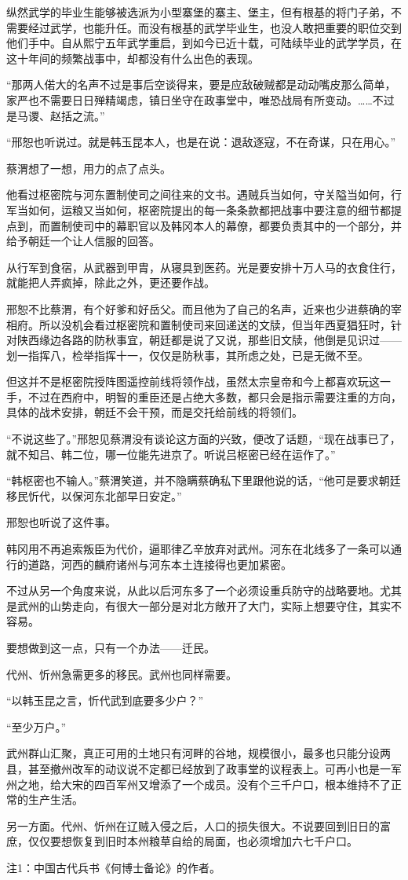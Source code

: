 纵然武学的毕业生能够被选派为小型寨堡的寨主、堡主，但有根基的将门子弟，不需要经过武学，也能升任。而没有根基的武学毕业生，也没人敢把重要的职位交到他们手中。自从熙宁五年武学重启，到如今已近十载，可陆续毕业的武学学员，在这十年间的频繁战事中，却都没有什么出色的表现。

“那两人偌大的名声不过是事后空谈得来，要是应敌破贼都是动动嘴皮那么简单，家严也不需要日日殚精竭虑，镇日坐守在政事堂中，唯恐战局有所变动。……不过是马谡、赵括之流。”

“邢恕也听说过。就是韩玉昆本人，也是在说：退敌逐寇，不在奇谋，只在用心。”

蔡渭想了一想，用力的点了点头。

他看过枢密院与河东置制使司之间往来的文书。遇贼兵当如何，守关隘当如何，行军当如何，运粮又当如何，枢密院提出的每一条条款都把战事中要注意的细节都提点到，而置制使司中的幕职官以及韩冈本人的幕僚，都要负责其中的一个部分，并给予朝廷一个让人信服的回答。

从行军到食宿，从武器到甲胄，从寝具到医药。光是要安排十万人马的衣食住行，就能把人弄疯掉，除此之外，更还要作战。

邢恕不比蔡渭，有个好爹和好岳父。而且他为了自己的名声，近来也少进蔡确的宰相府。所以没机会看过枢密院和置制使司来回递送的文牍，但当年西夏猖狂时，针对陕西缘边各路的防秋事宜，朝廷都是说了又说，那些旧文牍，他倒是见识过——划一指挥八，检举指挥十一，仅仅是防秋事，其所虑之处，已是无微不至。

但这并不是枢密院授阵图遥控前线将领作战，虽然太宗皇帝和今上都喜欢玩这一手，不过在西府中，明智的重臣还是占绝大多数，都只会是指示需要注重的方向，具体的战术安排，朝廷不会干预，而是交托给前线的将领们。

“不说这些了。”邢恕见蔡渭没有谈论这方面的兴致，便改了话题，“现在战事已了，就不知吕、韩二位，哪一位能先进京了。听说吕枢密已经在运作了。”

“韩枢密也不输人。”蔡渭笑道，并不隐瞒蔡确私下里跟他说的话，“他可是要求朝廷移民忻代，以保河东北部早日安定。”

邢恕也听说了这件事。

韩冈用不再追索叛臣为代价，逼耶律乙辛放弃对武州。河东在北线多了一条可以通行的道路，河西的麟府诸州与河东本土连接得也更加紧密。

不过从另一个角度来说，从此以后河东多了一个必须设重兵防守的战略要地。尤其是武州的山势走向，有很大一部分是对北方敞开了大门，实际上想要守住，其实不容易。

要想做到这一点，只有一个办法——迁民。

代州、忻州急需更多的移民。武州也同样需要。

“以韩玉昆之言，忻代武到底要多少户？”

“至少万户。”

武州群山汇聚，真正可用的土地只有河畔的谷地，规模很小，最多也只能分设两县，甚至撤州改军的动议说不定都已经放到了政事堂的议程表上。可再小也是一军州之地，给大宋的四百军州又增添了一个成员。没有个三千户口，根本维持不了正常的生产生活。

另一方面。代州、忻州在辽贼入侵之后，人口的损失很大。不说要回到旧日的富庶，仅仅要想恢复到旧时本州粮草自给的局面，也必须增加六七千户口。

注1：中国古代兵书《何博士备论》的作者。

